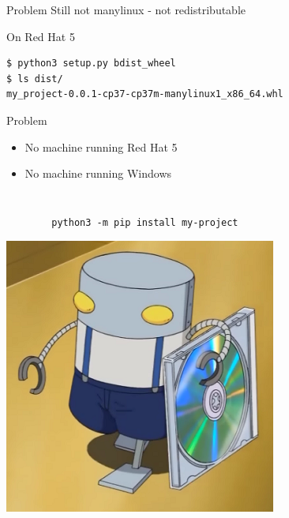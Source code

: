 \documentclass[pdf]{beamer}
\begin{document}
\begin{frame}
    \begin{block}{Problem}
        Still not manylinux - not redistributable
    \end{block}
\end{frame}

\begin{frame}[fragile]
    \begin{block}{On Red Hat 5}
        \begin{verbatim}
$ python3 setup.py bdist_wheel
$ ls dist/
my_project-0.0.1-cp37-cp37m-manylinux1_x86_64.whl
        \end{verbatim}
    \end{block}
\end{frame}

\begin{frame}
    \begin{block}{Problem}
        \begin{itemize}[<+->]
            \item No machine running Red Hat 5
            \item No machine running Windows
        \end{itemize}
    \end{block}
\end{frame}

\begin{frame}
    \inputminted[firstline = 16, lastline = 20]{yaml}{travis.yml}
\end{frame}

\begin{frame}[fragile]
    \inputminted[firstline = 44, lastline = 54]{yaml}{travis.yml}
\end{frame}

\begin{frame}[fragile]
    \begin{verbatim}
        python3 -m pip install my-project
    \end{verbatim}
\end{frame}

\begin{frame}
    \begin{center}
        \includegraphics[height = 0.8\textheight]{img/mechazawa-dist.png}
    \end{center}
\end{frame}
\end{document}
